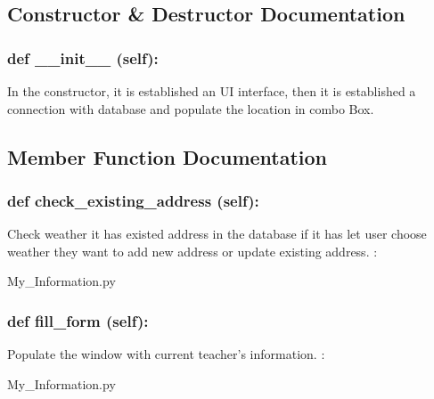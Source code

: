 \subsection{Constructor \& Destructor Documentation}
\hypertarget{class_poly_aa3def076b74bed67904976ad4f9fe9b1}{
\subsubsection[{def __init__ (self):}]{\setlength{\rightskip}{0pt plus 5cm}def {\_\_init\_\_} (self): 
}}
In the constructor, it is established an UI interface, then it is  established a connection with database and populate the location in combo Box.
 
\subsection{Member Function Documentation}
\hypertarget{class_poly_a14a7ad77ce612b0c54f531d307ee4b39}{
\subsubsection[{def check_existing_address (self):}]{\setlength{\rightskip}{0pt plus 5cm}def {check\_existing\_address} (self):}}\label{class_poly_a14a7ad77ce612b0c54f531d307ee4b39}
Check weather it has existed address in the database if it has let user choose weather they want to add new address or update existing address.
:\begin{DoxyCompactItemize}
\item 
My\_Information.\-py\end{DoxyCompactItemize}

\hypertarget{class_poly_a14a7ad77ce612b0c54f531d307ee4b39}{
\subsubsection[{def fill_form (self):}]{\setlength{\rightskip}{0pt plus 5cm}def {fill\_form} (self):}}\label{class_poly_a14a7ad77ce612b0c54f531d307ee4b39}
Populate the window with current teacher's information. 
:\begin{DoxyCompactItemize}
\item 
My\_Information.\-py\end{DoxyCompactItemize}

